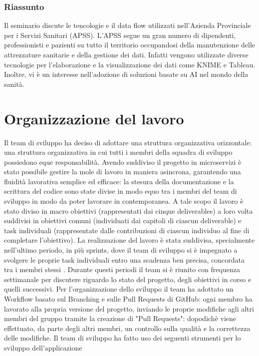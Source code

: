 \documentclass{report}
\begin{document}
\subsubsection*{Riassunto}
Il seminario discute le tencologie e il data flow utilizzati nell'Azienda Provinciale per i Servizi Sanitari (APSS). L'APSS segue un gran numero di dipendenti, professionisti e pazienti su tutto il territorio occupandosi della manutenzione delle attrezzature sanitarie e della gestione dei dati. Infatti vengono utilizzate diverse tecnologie per l'elaborazione e la visualizzazione dei dati come KNIME e Tableau. Inoltre, vi è un interesse nell'adozione di soluzioni basate su AI nel mondo della sanità.

\section{Organizzazione del lavoro}

Il team di sviluppo ha deciso di adottare una struttura organizzativa orizzontale: una struttura organizzativa in cui tutti i membri della squadra di sviluppo possiedono eque responsabilità.
Avendo suddiviso il progetto in microservizi è stato possibile gestire la mole di lavoro in maniera asincrona, garantendo una fluidità lavorativa semplice ed efficace: la stesura della documentazione e la scrittura del codice sono state divise in modo equo tra i membri del team di sviluppo
in modo da poter lavorare in contemporanea.
A tale scopo il lavoro è stato diviso in macro obiettivi (rappresentati dai cinque deliverables) a loro volta suddivisi in obiettivi comuni (individuati dai capitoli di ciascun deliverable) e task individuali (rappresentate dalle contribuzioni di ciascun individuo al fine di completare l'obiettivo).
La realizzazione del lavoro è stata suddivisa, specialmente nell'ultimo periodo, in più sprints, dove il team di sviluppo si è impegnato a svolgere le proprie task individuali entro una scadenza ben precisa, concordata tra i membri stessi . Durante questi periodi il team si è riunito con frequenza settimanale per discutere riguardo lo stato del progetto, degli obiettivi in corso e quelli successivi.
Per l'organizzazione dello sviluppo il team ha adottato un Workflow basato sul Branching e sulle Pull Requests di GitHub: ogni membro ha lavorato alla propria versione del progetto, inviando le proprie modifiche agli altri membri del gruppo tramite la creazione di "Pull Requests": dopodichè viene effettuato, da parte degli altri membri, un controllo sulla qualità e la correttezza delle modifiche.
Il team di sviluppo ha fatto uso dei seguenti strumenti per lo sviluppo dell'applicazione
\end{document}
